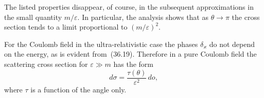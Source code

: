 The listed properties disappear, of course, in the subsequent approximations in the small quantity $m/\varepsilon$. In particular, the analysis shows that as $\theta \to \pi$ the cross section tends to a limit proportional to $(m/\varepsilon)^2$.

For the Coulomb field in the ultra-relativistic case the phases $\delta_\varkappa$ do not depend on the energy, as is evident from~(36.19). Therefore in a pure Coulomb field the scattering cross section for $\varepsilon \gg m$ has the form
\begin{equation}
d\sigma = \frac{\tau(\theta)}{\varepsilon^2}\,do,
\tag{38.7}
\end{equation}
where $\tau$ is a function of the angle only.
